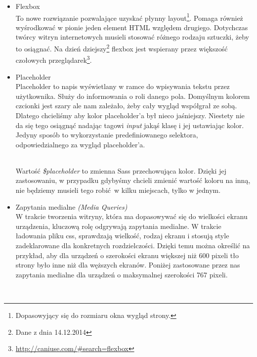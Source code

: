         \begin{itemize}
          \item Flexbox\\
            To nowe rozwiązanie pozwalające uzyskać płynny layout\footnote{Dopasowyjący się do rozmiaru okna wygląd strony.}. Pomaga również wyśrodkować w pionie jeden element HTML względem drugiego. Dotychczas twórcy witryn internetowych musieli stosować różnego rodzaju sztuczki, żeby to osiągnać. Na dzień dziejszy\footnote{Dane z dnia 14.12.2014} flexbox jest wspierany przez większość czołowych przeglądarek\footnote{\url{http://caniuse.com/\#search=flexbox}}. \\
            
            \clearpage
          \item Placeholder\\
            Placeholder to napis wyświetlany w ramce do wpisywania tekstu przez użytkownika. Służy do informowania o roli danego pola. Domyślnym kolorem czcionki jest szary ale nam zależało, żeby cały wygląd współgrał ze sobą. Dlatego chcieliśmy aby kolor placeholder'a był nieco jaśniejszy. Niestety nie da się tego osiągnąć nadając tagowi \emph{input} jakąś klasę i jej ustawiając kolor. Jedyny sposób to wykorzystanie predefiniowanego selektora, odpowiedzialnego za wygląd placeholder'a.

            \begin{code}
              
            \end{code}\\

            Wartość \emph{\$placeholder} to zmienna Sass przechowująca kolor. Dzięki jej zastosowaniu, w przypadku gdybyśmy chcieli zmienić wartość koloru na inną, nie będziemy musieli tego robić w kilku miejscach, tylko w jednym.

          \item Zapytania medialne \emph{(Media Queries)}\\
            W trakcie tworzenia witryny, która ma dopasowywać się do wielkości ekranu urządzenia, kluczową rolę odgrywają zapytania medialne. W trakcie ładowania pliku css, sprawdzają wielkość, rodzaj ekranu i stosują style zadeklarowane dla konkretnych rozdzielczości. Dzięki temu można określić na przykład, aby dla urządzeń o szerokości ekranu większej niż 600 pixeli tło strony było inne niż dla węższych ekranów.
            Poniżej zastosowane przez nas zapytania medialne dla urządzeń o maksymalnej szerokości 767 pixeli.
            \begin{code}
              
            \end{code}\\
        \end{itemize}
